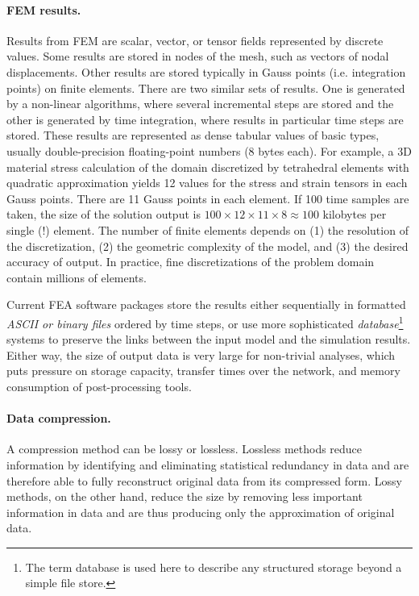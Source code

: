 \paragraph{FEM results.} Results from FEM are scalar, vector, or tensor fields represented by discrete values. Some results are stored in nodes of the mesh, such as vectors of nodal displacements. Other results are stored typically in Gauss points (i.e. integration points) on finite elements. There are two similar sets of results. One is generated by a non-linear algorithms, where several incremental steps are stored and the other is generated by time integration, where results in particular time steps are stored. These results are represented as dense tabular values of basic types, usually double-precision floating-point numbers (8 bytes each). For example, a 3D material stress calculation of the domain discretized by tetrahedral elements with quadratic approximation yields 12 values for the stress and strain tensors in each Gauss points. There are 11 Gauss points in each element. If 100 time samples are taken, the size of the solution output is $100 \times 12 \times 11 \times 8 \approx 100$ kilobytes per single (!) element. The number of finite elements depends on (1) the resolution of the discretization, (2) the geometric complexity of the model, and (3) the desired accuracy of output. In practice, fine discretizations of the problem domain contain millions of elements.

Current FEA software packages store the results either sequentially in formatted \textit{ASCII or binary files} ordered by time steps, or use more sophisticated \textit{database}\footnote{The term database is used here to describe any structured storage beyond a simple file store.} systems to preserve the links between the input model and the simulation results. Either way, the size of output data is very large for non-trivial analyses, which puts pressure on storage capacity, transfer times over the network, and memory consumption of post-processing tools.

\paragraph{Data compression.} A compression method can be lossy or lossless. Lossless methods reduce information by identifying and eliminating statistical redundancy in data and are therefore able to fully reconstruct original data from its compressed form. Lossy methods, on the other hand, reduce the size by removing less important information in data and are thus producing only the approximation of original data.

